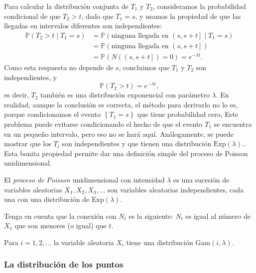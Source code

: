 	Para calcular la distribución conjunta de $T_{1}$ y $T_{2}$, consideramos la probabilidad condicional de que $T_{2}>t$, dado que $T_{1}=s$, y usamos la propiedad de que las llegadas en intervalos diferentes son independientes:
	\begin{align*}
		\mathds{P}\left(T_{2}>t\mid T_{1}=s\right)
		&=\mathds{P}\left(\text{ninguna llegada en }\left(s,s+t\right]\mid T_{1}=s\right)\\
		&=\mathds{P}\left(\text{ninguna llegada en }\left(s,s+t\right]\right)\\
		&=\mathds{P}\left(N\left(\left(s,s+t\right]\right)=0\right)=e^{-\lambda t}.
	\end{align*}
	Como esta respuesta no depende de $s$, concluimos que $T_{1}$ y $T_{2}$ son independientes, y
	\[
		\mathds{P}\left(T_{2}>t\right)=e^{-\lambda t},
	\]
	es decir, $T_{2}$ también es una distribución exponencial con parámetro $\lambda$. En realidad, aunque la conclusión es correcta, el método para derivarlo no lo es, porque condicionamos el evento $\left\{T_{1}=s\right\}$ que tiene probabilidad cero, Este problema puede evitarse condicionando el hecho de que el evento $T_{1}$ se encuentra en un pequeño intervalo, pero eso no se hará aquí. Análogamente, se puede mostrar que los $T_{i}$ son independientes y que tienen una distribución $\mathrm{Exp}\left(\lambda\right)$.. Esta bonita propiedad permite dar una definición simple del proceso de Poisson unidimensional.
	\begin{definition}
		El \textit{proceso de Poisson} unidimensional con intensidad $\lambda$ es una sucesión de variables aleatorias $X_{1},X_{2},X_{3},\ldots$ son variables aleatorias independientes, cada una con una distribución de $\mathrm{Exp}\left(\lambda\right)$.
	\end{definition}
	Tenga en cuenta que la conexión con $N_{t}$ es la siguiente: $N_{t}$ es igual al número de $X_{1}$ que son menores (o igual) que $t$.
	\begin{definition}
		Para $i=1,2,\ldots$ la variable aleatoria $X_{i}$ tiene una distribución $\mathrm{Gam}\left(i,\lambda\right)$.
	\end{definition}

\subsubsection{La distribución de los puntos}

